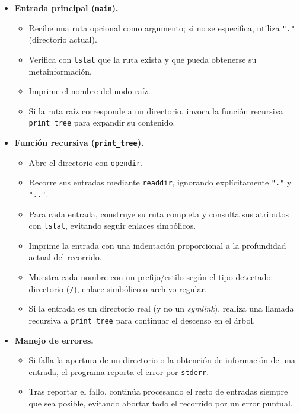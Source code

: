 \documentclass[12pt,spanish]{article}
\begin{document}
\begin{itemize}
    \item \textbf{Entrada principal (\texttt{main}).}
    \begin{itemize}
        \item Recibe una ruta opcional como argumento; si no se especifica, utiliza \texttt{"."} (directorio actual).
        \item Verifica con \texttt{lstat} que la ruta exista y que pueda obtenerse su metainformación.
        \item Imprime el nombre del nodo raíz.
        \item Si la ruta raíz corresponde a un directorio, invoca la función recursiva \texttt{print\_tree} para expandir su contenido.
    \end{itemize}

    \item \textbf{Función recursiva (\texttt{print\_tree}).}
    \begin{itemize}
        \item Abre el directorio con \texttt{opendir}.
        \item Recorre sus entradas mediante \texttt{readdir}, ignorando explícitamente \texttt{"."} y \texttt{".."}.
        \item Para cada entrada, construye su ruta completa y consulta sus atributos con \texttt{lstat}, evitando seguir enlaces simbólicos.
        \item Imprime la entrada con una indentación proporcional a la profundidad actual del recorrido.
        \item Muestra cada nombre con un prefijo/estilo según el tipo detectado: directorio (\texttt{/}), enlace simbólico o archivo regular.
        \item Si la entrada es un directorio real (y no un \textit{symlink}), realiza una llamada recursiva a \texttt{print\_tree} para continuar el descenso en el árbol.
    \end{itemize}

    \item \textbf{Manejo de errores.}
    \begin{itemize}
        \item Si falla la apertura de un directorio o la obtención de información de una entrada, el programa reporta el error por \texttt{stderr}.
        \item Tras reportar el fallo, continúa procesando el resto de entradas siempre que sea posible, evitando abortar todo el recorrido por un error puntual.
    \end{itemize}
\end{itemize}
\end{document}

